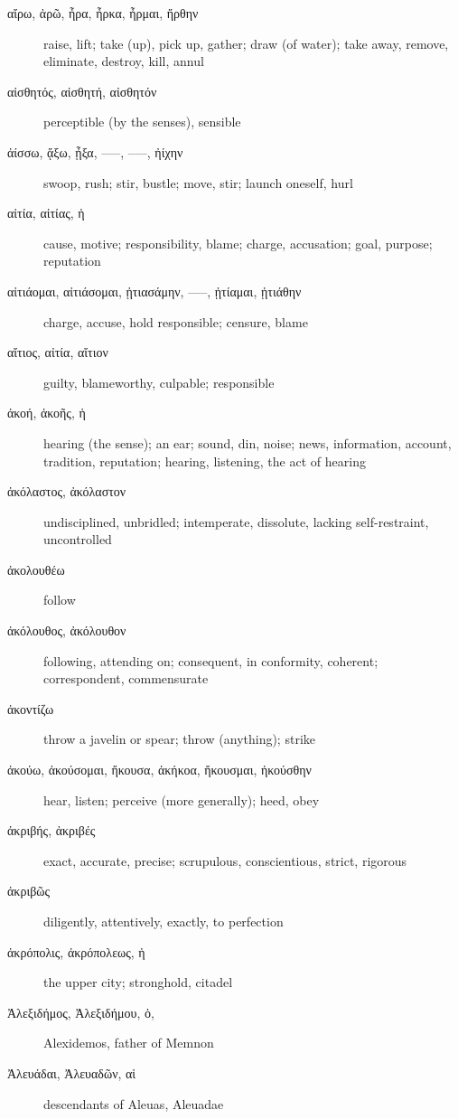 \documentclass[12pt,letterpaper]{article}
\begin{document}
\begin{description}
    \item[\textgreek{αἴρω, ἀρῶ, ἦρα, ἦρκα, ἦρμαι, ἤρθην}] \marginnote{*}raise, lift; take (up), pick up, gather; draw (of water); take away, remove, eliminate, destroy, kill, annul
    \item[\textgreek{αἰσθητός, αἰσθητή, αἰσθητόν}] perceptible (by the senses), sensible
    \item[\textgreek{ἀίσσω, ᾄξω, ᾖξα, –––, –––, ἠίχην}] swoop, rush; stir, bustle; move, stir; launch oneself, hurl
    \item[\textgreek{αἰτία, αἰτίας, ἡ}] \marginnote{*}cause, motive; responsibility, blame; charge, accusation; goal, purpose; reputation
    \item[\textgreek{αἰτιάομαι, αἰτιάσομαι, ᾐτιασάμην, –––, ᾐτίαμαι, ᾐτιάθην}] charge, accuse, hold responsible; censure, blame
    \item[\textgreek{αἴτιος, αἰτία, αἴτιον}] \marginnote{*}guilty, blameworthy, culpable; responsible
    \item[\textgreek{ἀκοή, ἀκοῆς, ἡ}] hearing (the sense); an ear; sound, din, noise; news, information, account, tradition, reputation; hearing, listening, the act of hearing
    \item[\textgreek{ἀκόλαστος, ἀκόλαστον}] undisciplined, unbridled; intemperate, dissolute, lacking self-restraint, uncontrolled
    \item[\textgreek{ἀκολουθέω}] follow
    \item[\textgreek{ἀκόλουθος, ἀκόλουθον}] following, attending on; consequent, in conformity, coherent; correspondent, commensurate
    \item[\textgreek{ἀκοντίζω}] throw a javelin or spear; throw (anything); strike
    \item[\textgreek{ἀκούω, ἀκούσομαι, ἤκουσα, ἀκήκοα, ἤκουσμαι, ἠκούσθην}] \marginnote{*}hear, listen; perceive (more generally); heed, obey
    \item[\textgreek{ἀκριβής, ἀκριβές}] \marginnote{*}exact, accurate, precise; scrupulous, conscientious, strict, rigorous
    \item[\textgreek{ἀκριβῶς}] diligently, attentively, exactly, to perfection
    \item[\textgreek{ἀκρόπολις, ἀκρόπολεως, ἡ}] the upper city; stronghold, citadel
    \item[\textgreek{Ἀλεξιδήμος, Ἀλεξιδήμου, ὁ, }] Alexidemos, father of Memnon
    \item[\textgreek{Ἀλευάδαι, Ἀλευαδῶν, αἱ}] descendants of Aleuas, Aleuadae

\end{description}
\end{document}

